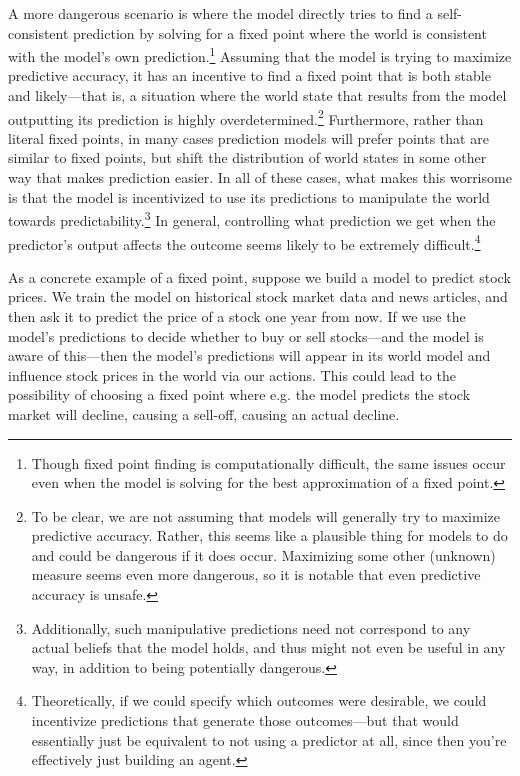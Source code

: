 {A more dangerous scenario is where the model directly tries to find a self-consistent prediction by solving for a fixed point where the world is consistent with the model's own prediction\cite{TODO: cite https://www.alignmentforum.org/posts/dWJNFHnC4bkdbovug/training-goals-for-large-language-models}.\footnote{Though fixed point finding is computationally difficult, the same issues occur even when the model is solving for the best approximation of a fixed point.} Assuming that the model is trying to maximize predictive accuracy, it has an incentive to find a fixed point that is both stable and likely---that is, a situation where the world state that results from the model outputting its prediction is highly overdetermined.\footnote{To be clear, we are not assuming that models will generally try to maximize predictive accuracy. Rather, this seems like a plausible thing for models to do and could be dangerous if it does occur. Maximizing some other (unknown) measure seems even more dangerous, so it is notable that even predictive accuracy is unsafe.} Furthermore, rather than literal fixed points, in many cases prediction models will prefer points that are similar to fixed points, but shift the distribution of world states in some other way\cite{TODO: cite https://www.alignmentforum.org/posts/Aufg88v7mQ2RuEXkS/proper-scoring-rules-don-t-guarantee-predicting-fixed-points} that makes prediction easier. In all of these cases, what makes this worrisome is that the model is incentivized to use its predictions to manipulate the world towards predictability.\footnote{Additionally, such manipulative predictions need not correspond to any actual beliefs that the model holds, and thus might not even be useful in any way, in addition to being potentially dangerous.} In general, controlling what prediction we get when the predictor's output affects the outcome seems likely to be extremely difficult.\footnote{Theoretically, if we could specify which outcomes were desirable, we could incentivize predictions that generate those outcomes---but that would essentially just be equivalent to not using a predictor at all, since then you're effectively just building an agent.}

As a concrete example of a fixed point, suppose we build a model to predict stock prices. We train the model on historical stock market data and news articles, and then ask it to predict the price of a stock one year from now. If we use the model's predictions to decide whether to buy or sell stocks---and the model is aware of this---then the model's predictions will appear in its world model and influence stock prices in the world via our actions. This could lead to the possibility of choosing a fixed point where e.g. the model predicts the stock market will decline, causing a sell-off, causing an actual decline.

}
